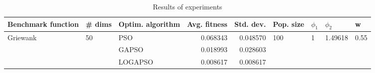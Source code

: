 \begin{table}
\centering
\caption{Results of experiments}
\begin{tabular}{lllrrllll}
\toprule
       Benchmark function &             \# dims & Optim. algorithm &  Avg. fitness &  Std. dev. &            Pop. size &         $\phi_{1}$ &               $\phi_{2}$ &                     w \\
\midrule
\multirow{3}{*}{Griewank} & \multirow{3}{*}{50} &              PSO &      0.068343 &   0.048570 & \multirow{3}{*}{100} & \multirow{3}{*}{1} & \multirow{3}{*}{1.49618} & \multirow{3}{*}{0.55} \\
                          &                     &            GAPSO &      0.018993 &   0.028603 &                      &                    &                          &                       \\
                          &                     &          LOGAPSO &      0.008617 &   0.008617 &                      &                    &                          &                       \\
\bottomrule
\end{tabular}
\end{table}
